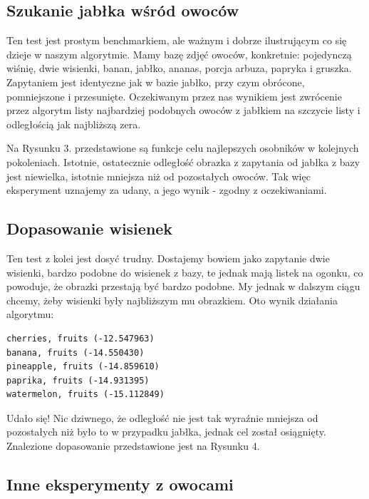 \documentclass[a4paper,12pt,leqno]{article}
\begin{document}
\subsection{Szukanie jabłka wśród owoców}
Ten test jest prostym benchmarkiem, ale ważnym i dobrze ilustrującym co się dzieje w naszym algorytmie. Mamy bazę zdjęć owoców, konkretnie: 
pojedynczą wiśnię, dwie wisienki, banan, jabłko, ananas, porcja arbuza, papryka i gruszka. Zapytaniem jest identyczne jak w bazie jabłko, przy czym obrócone, pomniejszone i przesunięte.
Oczekiwanym przez nas wynikiem jest zwrócenie przez algorytm listy najbardziej podobnych owoców z jabłkiem na szczycie listy i odległością jak najbliższą zera.

Na Rysunku 3. przedstawione są funkcje celu najlepszych osobników w kolejnych pokoleniach. Istotnie, ostatecznie odległość obrazka z zapytania od jabłka z bazy jest niewielka, 
istotnie mniejsza niż od pozostałych owoców. Tak więc eksperyment uznajemy za udany, a jego wynik - zgodny z oczekiwaniami.

\subsection{Dopasowanie wisienek}
Ten test z kolei jest dosyć trudny. Dostajemy bowiem jako zapytanie dwie wisienki, bardzo podobne do wisienek z bazy, te jednak mają listek na ogonku, co powoduje,
że obrazki przestają być bardzo podobne. My jednak w dalszym ciągu chcemy, żeby wisienki były najbliższym mu obrazkiem. Oto wynik działania algorytmu:
\begin{verbatim}
cherries, fruits (-12.547963)
banana, fruits (-14.550430)
pineapple, fruits (-14.859610)
paprika, fruits (-14.931395)
watermelon, fruits (-15.112849)
\end{verbatim}
Udało się! Nic dziwnego, że odległość nie jest tak wyraźnie mniejsza od pozostałych niż było to w przypadku jabłka, jednak cel został osiągnięty. 
Znalezione dopasowanie przedstawione jest na Rysunku 4.

\subsection{Inne eksperymenty z owocami}
\end{document}
